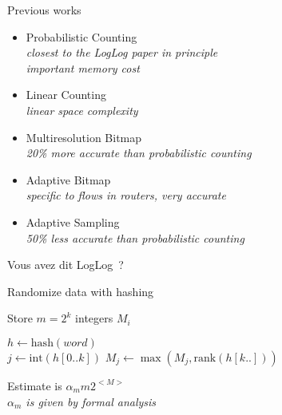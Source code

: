 \documentclass[aspectratio=169]{beamer}
\begin{document}
  \begin{frame}{Previous works}
    \only<+->{\vspace*{.4cm}}

    \begin{itemize}[<+-|alert@+>]
      \item Probabilistic Counting\\
        {\footnotesize\itshape%
        closest to the LogLog paper in principle\\
        important memory cost}
      \item Linear Counting\\
        {\footnotesize\itshape%
        linear space complexity}
      \item Multiresolution Bitmap\\
        {\footnotesize\itshape%
        20\% more accurate than probabilistic counting}
      \item Adaptive Bitmap\\
        {\footnotesize\itshape%
        specific to flows in routers, very accurate}
      \item Adaptive Sampling\\
        {\footnotesize\itshape%
        50\% less accurate than probabilistic counting}
    \end{itemize}

  \end{frame}


  \begin{frame}{Vous avez dit LogLog~?}
    \only<+->{\vspace*{.4cm}}

    \begin{center}
      \begin{description}[<+-|alert@+>]
        \item[Probabilistic] Randomize data with hashing
        \item[Storage] Store $m = 2^k$ integers $M_i$
        \item[Compute] $h \gets \mathrm{hash}(word)$\\
          $j \gets \mathrm{int}(h[0..k])$
          $M_j \gets \max(M_j, \mathrm{rank}(h[k..]))$
        \item[Summary] Estimate is $\alpha_mm2^{<M>}$\\
          {\footnotesize\itshape%
          $\alpha_m$ is given by formal analysis}
      \end{description}
    \end{center}
  \end{frame}
\end{document}
